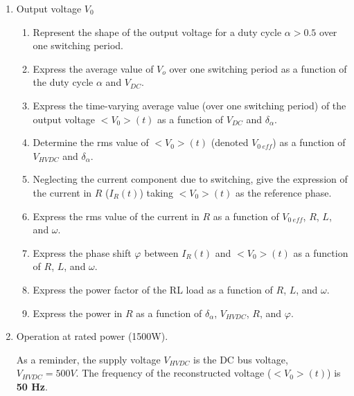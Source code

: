 \begin{enumerate}
%

\item Output voltage $V_0$

\begin{enumerate}
\item Represent the shape of the output voltage for a duty cycle $\alpha > 0.5$ over one switching period.
\item Express the average value of $V_o$ over one switching period as a function of the duty cycle $\alpha$ and $V_{DC}$.
\item Express the time-varying average value (over one switching period) of the output voltage $<V_0>(t)$ as a function of $V_{DC}$ and $\delta_\alpha$.
\item Determine the rms value of $<V_0>(t)$ (denoted $V_{0\ eff}$) as a function of $V_{HVDC}$ and $\delta_\alpha$.
\item Neglecting the current component due to switching, give the expression of the current in $R$ ($I_R(t)$) taking $<V_0>(t)$ as the reference phase.
\item Express the rms value of the current in $R$ as a function of $V_{0\ eff}$, $R$, $L$, and $\omega$.
\item Express the phase shift $\varphi$ between $I_R(t)$ and $<V_0>(t)$ as a function of $R$, $L$, and $\omega$.
\item Express the power factor of the RL load as a function of $R$, $L$, and $\omega$.
\item Express the power in $R$ as a function of $\delta_\alpha$, $V_{HVDC}$, $R$, and $\varphi$.
\end{enumerate}
\item Operation at rated power (1500W).

As a reminder, the supply voltage $V_{HVDC}$ is the DC bus voltage, $V_{HVDC}=500 V$. The frequency of the reconstructed voltage ($<V_0>(t)$) is \textbf{50 Hz}.


\end{enumerate}
